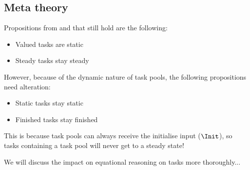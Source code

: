 \subsection{Meta theory}

Propositions from \cite{Steenvoorden22} and \cite{Klijnsma2020} that still hold are the following:

\begin{itemize}
  \item Valued tasks are static
  \item Steady tasks stay steady
\end{itemize}

However, because of the dynamic nature of task pools, the following propositions need alteration:

\begin{itemize}
  \item Static tasks stay static
  \item Finished tasks stay finished
\end{itemize}

This is because task pools can always receive the initialise input ($\Init$),
so tasks containing a task pool will never get to a steady state!

We will discuss the impact on equational reasoning on tasks more thoroughly...